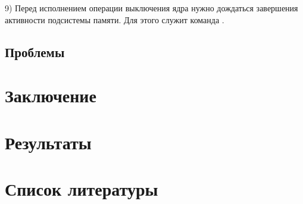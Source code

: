 \documentclass{article}
\begin{document}
9) Перед исполнением операции выключения ядра нужно дождаться завершения
активности подсистемы памяти. Для этого служит команда {}.

\newpage


\subsection{Проблемы}

\newpage
\section{Заключение}

\section{Результаты}

\newpage
\section{Список литературы}
\end{document}
